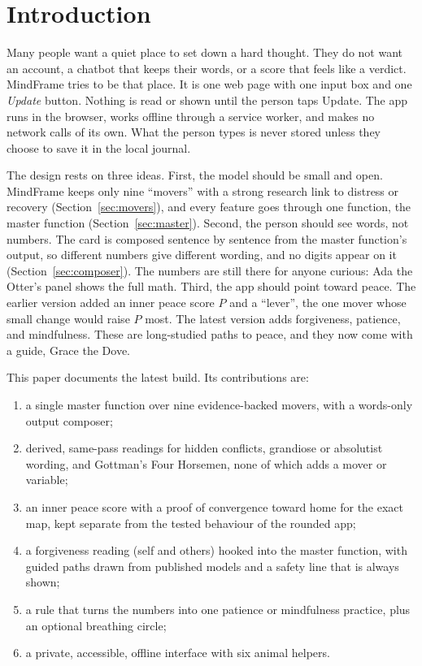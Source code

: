 \documentclass[10pt]{article}
\theoremstyle{definition}
\theoremstyle{remark}
\begin{document}
\vspace{6pt}
\setcounter{tocdepth}{1}
{\small\tableofcontents}
\clearpage

\section{Introduction}
\label{sec:intro}
Many people want a quiet place to set down a hard thought. They do not want an account, a chatbot that keeps their words, or a score that feels like a verdict. MindFrame tries to be that place. It is one web page with one input box and one \emph{Update} button. Nothing is read or shown until the person taps Update. The app runs in the browser, works offline through a service worker, and makes no network calls of its own. What the person types is never stored unless they choose to save it in the local journal.

The design rests on three ideas. First, the model should be small and open. MindFrame keeps only nine ``movers'' with a strong research link to distress or recovery (Section~\ref{sec:movers}), and every feature goes through one function, the master function (Section~\ref{sec:master}). Second, the person should see words, not numbers. The card is composed sentence by sentence from the master function's output, so different numbers give different wording, and no digits appear on it (Section~\ref{sec:composer}). The numbers are still there for anyone curious: Ada the Otter's panel shows the full math. Third, the app should point toward peace. The earlier version added an inner peace score $P$ and a ``lever'', the one mover whose small change would raise $P$ most. The latest version adds forgiveness, patience, and mindfulness. These are long-studied paths to peace, and they now come with a guide, Grace the Dove.

This paper documents the latest build. Its contributions are:
\begin{enumerate}
\item a single master function over nine evidence-backed movers, with a words-only output composer;
\item derived, same-pass readings for hidden conflicts, grandiose or absolutist wording, and Gottman's Four Horsemen, none of which adds a mover or variable;
\item an inner peace score with a proof of convergence toward home for the exact map, kept separate from the tested behaviour of the rounded app;
\item a forgiveness reading (self and others) hooked into the master function, with guided paths drawn from published models and a safety line that is always shown;
\item a rule that turns the numbers into one patience or mindfulness practice, plus an optional breathing circle;
\item a private, accessible, offline interface with six animal helpers.
\end{enumerate}
\end{document}
